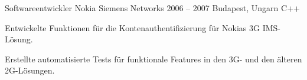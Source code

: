 \cvexperience
  {Softwareentwickler}
  {Nokia Siemens Networks}
  {2006 -- 2007}
  {Budapest, Ungarn}
  {C++}
  {%
    \item Entwickelte Funktionen für die Kontenauthentifizierung für Nokias 3G IMS-Lösung.
    \item Erstellte automatisierte Tests für funktionale Features in den 3G- und den älteren 2G-Lösungen.
  }
